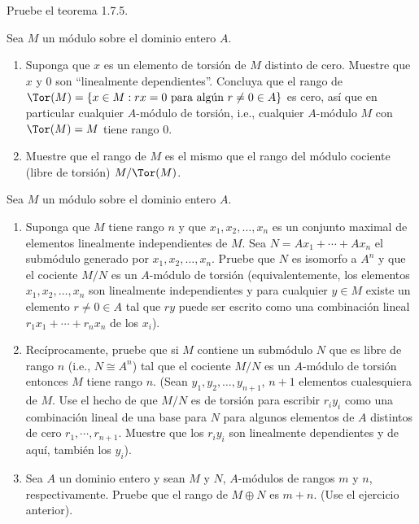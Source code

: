 \begin{exerciseList}
  \item Pruebe el teorema 1.7.5.
  
  \item Sea $M$ un módulo sobre el dominio entero $A$.
    \begin{enumerate}
      \item Suponga que $x$ es un elemento de torsión de $M$ distinto de cero. Muestre que $x$ y $0$ son ``linealmente dependientes''. Concluya que el rango de $\Tor(M) = \{x \in M : rx = 0 \ \text{para algún}\ r \neq 0 \in A\}$ es cero, así que en particular cualquier $A$-módulo de torsión, i.e., cualquier $A$-módulo $M$ con $\Tor(M) = M$ tiene rango $0$.
      \item Muestre que el rango de $M$ es el mismo que el rango del módulo cociente (libre de torsión) $M/\Tor(M)$.
    \end{enumerate}
    
    \item Sea $M$ un módulo sobre el dominio entero $A$.
    \begin{enumerate}
      \item Suponga que $M$ tiene rango $n$ y que $x_1,x_2,\ldots,x_n$ es un conjunto maximal de elementos linealmente independientes de $M$. Sea $N = Ax_1 + \cdots + Ax_n$ el submódulo generado por $x_1,x_2,\ldots,x_n$. Pruebe que $N$ es isomorfo a $A^n$ y que el cociente $M/N$ es un $A$-módulo de torsión (equivalentemente, los elementos $x_1,x_2,\ldots,x_n$ son linealmente independientes y para cualquier $y \in M$ existe un elemento $r \neq 0 \in A$ tal que $ry$ puede ser escrito como una combinación lineal $r_1x_1 + \cdots + r_nx_n$ de los $x_i$).
      \item Recíprocamente, pruebe que si $M$ contiene un submódulo $N$ que es libre de rango $n$ (i.e., $N \cong A^n$) tal que el cociente $M/N$ es un $A$-módulo de torsión entonces $M$ tiene rango $n$. (Sean $y_1,y_2,\ldots,y_{n+1}$, $n+1$ elementos cualesquiera de $M$. Use el hecho de que $M/N$ es de torsión para escribir $r_iy_i$ como una combinación lineal de una base para $N$ para algunos elementos de $A$ distintos de cero $r_1,\cdots,r_{n+1}$. Muestre que los $r_iy_i$ son linealmente dependientes y de aquí, también los $y_i$).
      \item Sea $A$ un dominio entero y sean $M$ y $N$, $A$-módulos de rangos $m$ y $n$, respectivamente. Pruebe que el rango de $M \oplus N$ es $m+n$. (Use el ejercicio anterior).
    \end{enumerate}
\end{exerciseList}